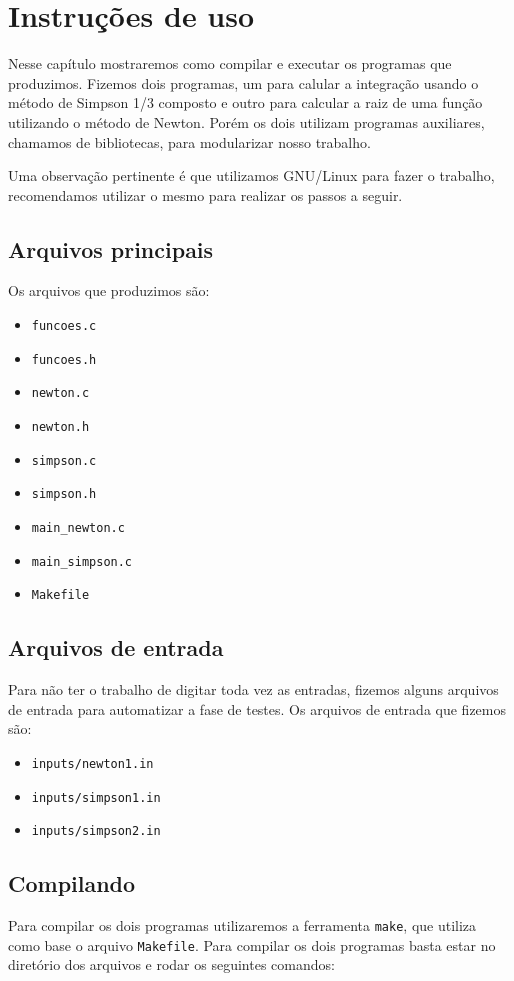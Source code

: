 \chapter{Instruções de uso}
Nesse capítulo mostraremos como compilar e executar os programas que produzimos.
Fizemos dois programas, um para calular a integração usando o método de Simpson
1/3 composto e outro para calcular a raiz de uma função utilizando o método de
Newton. Porém os dois utilizam programas auxiliares, chamamos de bibliotecas,
para modularizar nosso trabalho.

Uma observação pertinente é que utilizamos GNU/Linux para fazer o trabalho,
recomendamos utilizar o mesmo para realizar os passos a seguir.

\section{Arquivos principais}
Os arquivos que produzimos são:
\begin{multicols}{2}
	\begin{itemize}
		\item \texttt{funcoes.c}
		\item \texttt{funcoes.h}
		\item \texttt{newton.c}
		\item \texttt{newton.h}
		\item \texttt{simpson.c}
		\item \texttt{simpson.h}
		\item \texttt{main\_newton.c}
		\item \texttt{main\_simpson.c}
		\item \texttt{Makefile}
	\end{itemize}
\end{multicols}

\section{Arquivos de entrada}
Para não ter o trabalho de digitar toda vez as entradas, fizemos alguns arquivos de entrada para automatizar a fase de testes. Os arquivos de entrada que fizemos são:
\begin{itemize}
	\item \texttt{inputs/newton1.in}
	\item \texttt{inputs/simpson1.in}
	\item \texttt{inputs/simpson2.in}
\end{itemize}

\section{Compilando}
Para compilar os dois programas utilizaremos a ferramenta \texttt{make}, que
utiliza como base o arquivo \texttt{Makefile}. Para compilar os dois programas
basta estar no diretório dos arquivos e rodar os seguintes comandos:

